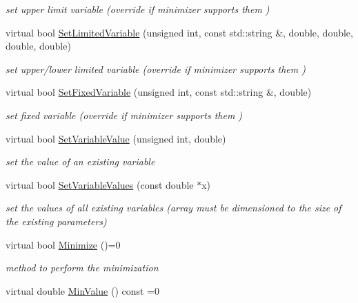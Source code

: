 \begin{DoxyCompactItemize}
\begin{DoxyCompactList}\small\item\em set upper limit variable (override if minimizer supports them ) \end{DoxyCompactList}\item 
virtual bool \mbox{\hyperlink{classROOT_1_1Math_1_1Minimizer_a4303530cbb62ceb7cf9c9ebcbde530c2}{Set\+Limited\+Variable}} (unsigned int, const std\+::string \&, double, double, double, double)
\begin{DoxyCompactList}\small\item\em set upper/lower limited variable (override if minimizer supports them ) \end{DoxyCompactList}\item 
virtual bool \mbox{\hyperlink{classROOT_1_1Math_1_1Minimizer_a063e9d83c8a61afc8798ebb1d74b6f2b}{Set\+Fixed\+Variable}} (unsigned int, const std\+::string \&, double)
\begin{DoxyCompactList}\small\item\em set fixed variable (override if minimizer supports them ) \end{DoxyCompactList}\item 
virtual bool \mbox{\hyperlink{classROOT_1_1Math_1_1Minimizer_a47e9a16c7a0b4ecfe769ee4be048d5c3}{Set\+Variable\+Value}} (unsigned int, double)
\begin{DoxyCompactList}\small\item\em set the value of an existing variable \end{DoxyCompactList}\item 
virtual bool \mbox{\hyperlink{classROOT_1_1Math_1_1Minimizer_ac8368efbd59da8e0b8bc0a0966309609}{Set\+Variable\+Values}} (const double $\ast$x)
\begin{DoxyCompactList}\small\item\em set the values of all existing variables (array must be dimensioned to the size of the existing parameters) \end{DoxyCompactList}\item 
virtual bool \mbox{\hyperlink{classROOT_1_1Math_1_1Minimizer_a5f6a6307935a17fb13dac1ee7f1c41fd}{Minimize}} ()=0
\begin{DoxyCompactList}\small\item\em method to perform the minimization \end{DoxyCompactList}\item 
virtual double \mbox{\hyperlink{classROOT_1_1Math_1_1Minimizer_ae4845ff42bc0e244fdfa068c53b9a965}{Min\+Value}} () const =0

\end{DoxyCompactItemize}
